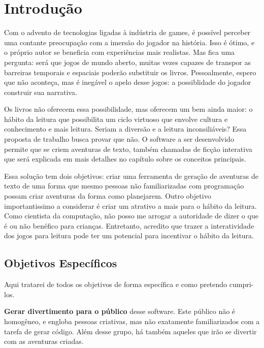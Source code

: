 \chapter{Introdução}
\label{cap:introducao}

Com o advento de tecnologias  ligadas à indústria de games, é possível perceber uma contante
preocupação com a imersão do jogador na história. Isso é ótimo, e o próprio autor se beneficia
com experiências mais realistas. Mas fica uma pergunta: será que jogos de mundo aberto, muitas
vezes capazes de transpor as barreiras temporais e espaciais poderão substituir os livros.
Pessoalmente, espero que não aconteça, mas é inegável o apelo desse jogos: a possiblidade do
jogador construir sua narrativa.

Os livros não oferecem essa possibilidade, mas oferecem um bem ainda maior: o hábito da leitura que
possibilita um ciclo virtuoso que envolve cultura e conhecimento e mais leitura. Seriam a diversão
e a leitura inconsiliáveis? Essa proposta de trabalho busca provar que não. O software a ser desenvolvido
permite que se criem aventuras de texto, também chamadas de ficção interativa que será explicada em mais
detalhes no capítulo sobre os conceitos principais.

Essa solução tem dois objetivos: criar uma ferramenta de geração de aventuras de texto de uma forma que
mesmo pessoas não familiarizadas com programação possam criar aventuras da forma como planejarem. Outro
objetivo importantissimo a considerar é criar um atrativo a mais para o hábito da leitura. Como cientista
da computação, não posso me arrogar a autoridade de dizer o que é ou não benéfico para crianças. Entretanto,
acredito que trazer a interatividade dos jogos para leitura pode ter um potencial para incentivar o hábito
da leitura.



\section{Objetivos Específicos}
\label{sec:goals}

Aqui tratarei de todos os objetivos de forma específica e como pretendo cumpri-los.

\textbf{Gerar divertimento para o público} desse software. Este público não é homogêneo, e engloba
pessoas criativas, mas não exatamente familiarizados com a tarefa de gerar código. Além desse grupo,
há também aqueles que irão se divertir com as aventuras criadas.

